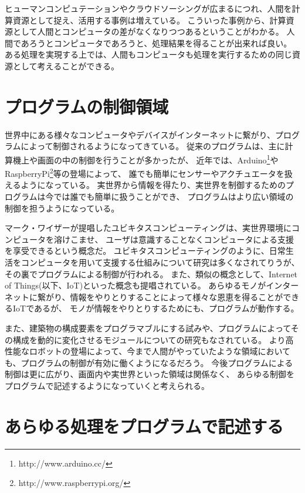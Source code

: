 ヒューマンコンピュテーションやクラウドソーシングが広まるにつれ、人間を計算資源として捉え、活用する事例は増えている。
こういった事例から、計算資源として人間とコンピュータの差がなくなりつつあるということがわかる。
人間であろうとコンピュータであろうと、処理結果を得ることが出来れば良い。
ある処理を実現する上では、人間もコンピュータも処理を実行するための同じ資源として考えることができる。

\section{プログラムの制御領域}\label{ux30d7ux30edux30b0ux30e9ux30e0ux306eux5236ux5fa1ux9818ux57df}

世界中にある様々なコンピュータやデバイスがインターネットに繋がり、プログラムによって制御されるようになってきている。
従来のプログラムは、主に計算機上や画面の中の制御を行うことが多かったが、
近年では、Arduino\footnote{http://www.arduino.cc/}やRaspberryPi\footnote{http://www.raspberrypi.org/}等の登場によって、
誰でも簡単にセンサーやアクチュエータを扱えるようになっている。
実世界から情報を得たり、実世界を制御するためのプログラムは今では誰でも簡単に扱うことができ、
プログラムはより広い領域の制御を担うようになっている。

マーク・ワイザーが提唱したユビキタスコンピューティング\cite{weiser1991computer}は、実世界環境にコンピュータを溶けこませ、
ユーザは意識することなくコンピュータによる支援を享受できるという概念だ。
ユビキタスコンピューティングのように、日常生活をコンピュータを用いて支援する仕組みについて研究は多くなされてりうが、
その裏でプログラムによる制御が行われる。
また、類似の概念として、Internet of
Things(以下、IoT)\cite{iot}といった概念も提唱されている。
あらゆるモノがインターネットに繋がり、情報をやりとりすることによって様々な恩恵を得ることができるIoTであるが、
モノが情報をやりとりするためにも、プログラムが動作する。

また、建築物の構成要素をプログラマブルにする試み\cite{squama}や、プログラムによってその構成を動的に変化させるモジュールについての研究もなされている。
より高性能なロボットの登場によって、今まで人間がやっていたような領域においても、プログラムの制御が有効に働くようになるだろう。
今後プログラムによる制御は更に広がり、画面内や実世界といった領域は関係なく、
あらゆる制御をプログラムで記述するようになっていくと考えられる。

\section{あらゆる処理をプログラムで記述する}\label{ux3042ux3089ux3086ux308bux51e6ux7406ux3092ux30d7ux30edux30b0ux30e9ux30e0ux3067ux8a18ux8ff0ux3059ux308b}

